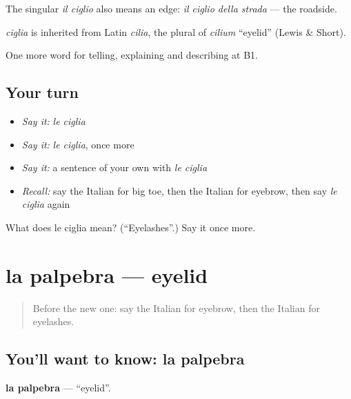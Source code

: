 The singular \emph{il ciglio} also means an edge: \emph{il ciglio della strada} — the roadside.

\begin{cousinweb}
\emph{ciglia} is inherited from Latin \emph{cilia}, the plural of \emph{cilium} \textquotedblleft{}eyelid\textquotedblright{} (Lewis \& Short).
\end{cousinweb}

\begin{grammarlens}[title={What you've built}]
One more word for telling, explaining and describing at B1.
\end{grammarlens}

\subsection*{Your turn}
\begin{itemize}
\raggedright
  \item \emph{Say it:} \emph{le ciglia}
  \item \emph{Say it:} \emph{le ciglia}, once more
  \item \emph{Say it:} a sentence of your own with \emph{le ciglia}
  \item \emph{Recall:} say the Italian for big toe, then the Italian for eyebrow, then say \emph{le ciglia} again
\end{itemize}

\begin{tcolorbox}[breakable,colback=teal!4,colframe=teal!35!black,title={Before you move on}]
What does le ciglia mean? (\textquotedblleft{}Eyelashes\textquotedblright{}.) Say it once more.
\end{tcolorbox}
\section[la palpebra]{la palpebra — eyelid}

\label{lesson:IT-C482-palpebra}



\begin{quote}
Before the new one: say the Italian for eyebrow, then the Italian for eyelashes.
\end{quote}

\subsection*{You'll want to know: la palpebra}
\textbf{la palpebra} — \textquotedblleft{}eyelid\textquotedblright{}.

